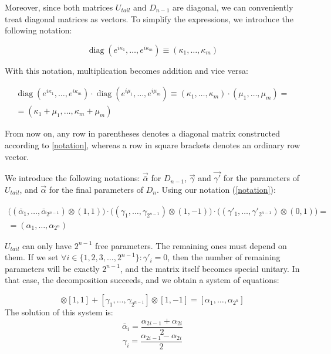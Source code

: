 \documentclass[a4paper, openany, 12pt]{article}
\theoremstyle{remark}
\theoremstyle{definition}
\newcommand{\diag}{\operatorname{diag}}
\begin{document}
Moreover, since both matrices $U_{tail}$ and $D_{n-1}$ are diagonal, we can conveniently treat diagonal matrices as vectors. To simplify the expressions, we introduce the following notation:

\begin{equation}
    \diag(e^{i\kappa_1},\dots,e^{i\kappa_m}) \equiv (\kappa_1,\dots,\kappa_m)
    \label{notation}
\end{equation}

With this notation, multiplication becomes addition and vice versa:

\begin{multline}
    \diag(e^{i\kappa_1},\dots,e^{i\kappa_m})\cdot \diag(e^{i\mu_1},\dots,e^{i\mu_m})
    \equiv (\kappa_1,\dots,\kappa_m)\cdot(\mu_1,\dots,\mu_m) =\\
    = (\kappa_1+\mu_1,\dots,\kappa_m+\mu_m)
\end{multline}

From now on, any row in parentheses denotes a diagonal matrix constructed according to \eqref{notation}, whereas a row in square brackets denotes an ordinary row vector.

We introduce the following notations: $\vec{\bar{\alpha}}$ for $D_{n-1}$, $\vec{\gamma}$ and $\vec{\gamma'}$ for the parameters of $U_{tail}$, and $\vec{\alpha}$ for the final parameters of $D_n$. Using our notation (\ref{notation}):


\begin{multline}
 \Big((\bar{\alpha}_1,\dots,\bar{\alpha}_{2^{n-1}}) \otimes (1,1)\Big) \cdot \Big((\gamma_1,\dots,\gamma_{2^{n-1}}) \otimes (1,-1)\Big)\cdot\Big((\gamma'_1,\dots,\gamma'_{2^{n-1}}) \otimes (0,1)\Big) = \\
 = (\alpha_1, \dots, \alpha_{2^n})
\end{multline}

$U_{tail}$ can only have $2^{n-1}$ free parameters. The remaining ones must depend on them. If we set $\forall i\in\{1,2,3,\dots,2^{n-1}\}: \gamma'_i=0$, then the number of remaining parameters will be exactly $2^{n-1}$, and the matrix itself becomes special unitary.
In that case, the decomposition succeeds, and we obtain a system of equations:


\begin{equation}
[\bar{\alpha}_1,\dots,\bar{\alpha}_{2^{n-1}}]\otimes[1,1] + [\gamma_1,\dots,\gamma_{2^{n-1}}]\otimes[1,-1] = [\alpha_1,\dots,\alpha_{2^n}] \end{equation}
The solution of this system is:
\begin{equation}     \bar{\alpha}_i = \frac{\alpha_{2i-1}+\alpha_{2i}}{2} \end{equation}
\begin{equation}     \gamma_i = \frac{\alpha_{2i-1}-\alpha_{2i}}{2} \end{equation}
\end{document}
